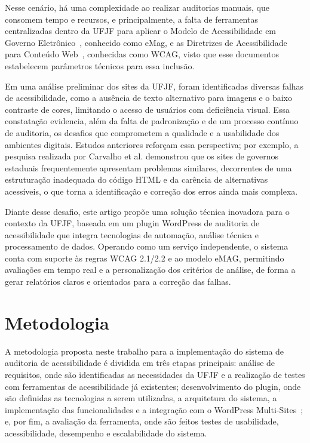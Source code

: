 \documentclass[
    12pt,
    a4paper,
    oneside,
    brazil,
    english
]{article}
\begin{document}
Nesse cenário, há uma complexidade ao realizar auditorias manuais, que consomem
tempo e recursos, e principalmente, a falta de ferramentas centralizadas dentro da UFJF para
aplicar o Modelo de Acessibilidade em Governo Eletrônico~\cite{emag},
conhecido como eMag, e as Diretrizes de Acessibilidade para Conteúdo Web~\cite{wcag22},
conhecidas como WCAG, visto que esse documentos estabelecem parâmetros técnicos para
essa inclusão.

Em uma análise preliminar dos sites da UFJF, foram identificadas diversas falhas de
acessibilidade, como a ausência de texto alternativo para imagens e o baixo contraste de cores,
limitando o acesso de usuários com deficiência visual. Essa constatação evidencia, além da
falta de padronização e de um processo contínuo de auditoria, os desafios que comprometem a
qualidade e a usabilidade dos ambientes digitais. Estudos anteriores reforçam essa perspectiva;
por exemplo, a pesquisa realizada por Carvalho et al. \cite{SBSI}
demonstrou que os sites de governos estaduais frequentemente apresentam problemas similares,
decorrentes de uma estruturação inadequada do código HTML e da carência de alternativas
acessíveis, o que torna a identificação e correção dos erros ainda mais complexa.

Diante desse desafio, este artigo propõe uma solução técnica inovadora para o
contexto da UFJF, baseada em um plugin WordPress de auditoria de acessibilidade que integra
tecnologias de automação, análise técnica e processamento de dados. Operando como um
serviço independente, o sistema conta com suporte às regras WCAG 2.1/2.2 e ao modelo
eMAG, permitindo avaliações em tempo real e a personalização dos critérios de análise, de
forma a gerar relatórios claros e orientados para a correção das falhas.

\section*{Metodologia}\label{sec:metodologia}
A metodologia proposta neste trabalho
para a implementação do sistema de auditoria de acessibilidade é dividida
em três etapas principais: análise de requisitos, onde são identificadas as
necessidades da UFJF e a realização de testes com ferramentas de acessibilidade já
existentes; desenvolvimento do plugin, onde são definidas as tecnologias a serem
utilizadas, a arquitetura do sistema, a implementação das funcionalidades e a
integração com o WordPress Multi-Sites~\cite{wp-ms}; e, por fim,
a avaliação da ferramenta,
onde são feitos testes de usabilidade, acessibilidade, desempenho e
escalabilidade do sistema.
\end{document}
